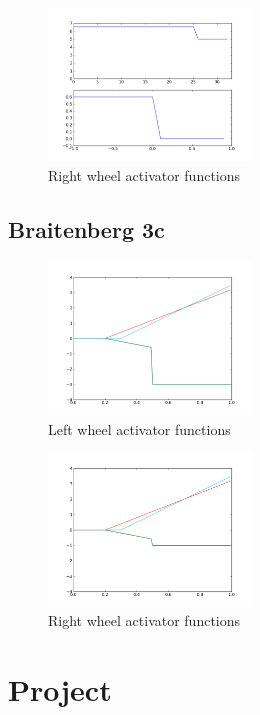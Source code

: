 \documentclass[a4paper]{article}
\begin{document}
\begin{figure}
	\begin{center}
		\includegraphics[width=0.48\textwidth]{graphs/activators/ellipse_r.png}
	\end{center}
	\caption{Right wheel activator functions}
\end{figure}

\subsection{Braitenberg 3c}

\begin{figure}
	\begin{center}
		\includegraphics[width=0.48\textwidth]{graphs/activators/3c_l.png}
	\end{center}
	\caption{Left wheel activator functions}
\end{figure}

\begin{figure}
	\begin{center}
		\includegraphics[width=0.48\textwidth]{graphs/activators/3c_r.png}
	\end{center}
	\caption{Right wheel activator functions}
\end{figure}

\cleardoublepage
\section{Project}
\end{document}
